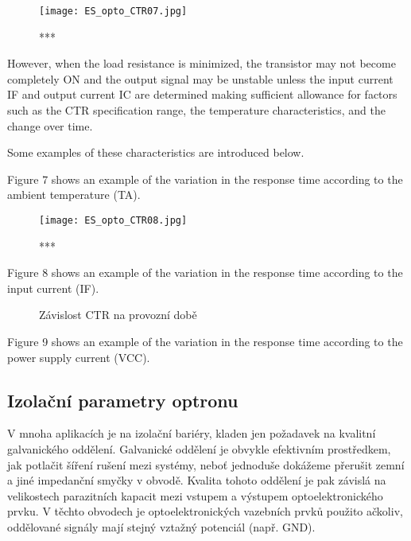          \begin{figure}[ht!]
           \centering
           \texttt{[image: ES\_opto\_CTR07.jpg]}
           \caption{***}
           \label{es:fig_opto_CTR07}
         \end{figure}             
          However, when the load resistance is minimized, the transistor may not become completely
          ON and the output signal may be unstable unless the input current IF and output current IC
          are determined making sufficient allowance for factors such as the CTR specification
          range, the temperature characteristics, and the change over time.
                   
          Some examples of these characteristics are introduced below.      
                   
          Figure 7 shows an example of the variation in the response time according to the ambient
          temperature (TA).
         
          \begin{figure}[ht!]
            \centering
            \texttt{[image: ES\_opto\_CTR08.jpg]}
            \caption{***}
            \label{es:fig_opto_CTR08}
          \end{figure}       
          Figure 8 shows an example of the variation in the response time according to the input
          current (IF).
          
          \begin{figure}[ht!]
            \centering
              {}                   \newline
              {}   
             \caption{Závislost CTR na provozní době}
             \label{ES:fig_opto_tfvsIF}
          \end{figure}
       
          Figure 9 shows an example of the variation in the response time according to the power
          supply current (VCC).
          
      \subsection{Izolační parametry optronu}
        V mnoha aplikacích je na izolační bariéry, kladen jen požadavek na kvalitní galvanického
        oddělení. Galvanické oddělení je obvykle efektivním prostředkem, jak potlačit šíření rušení
        mezi systémy, neboť jednoduše dokážeme přerušit zemní a jiné impedanční smyčky v obvodě.
        Kvalita tohoto oddělení je pak závislá na velikostech parazitních kapacit mezi vstupem a
        výstupem optoelektronického prvku. V těchto obvodech je optoelektronických vazebních prvků
        použito ačkoliv, oddělované signály mají stejný vztažný potenciál (např. GND). 
        
